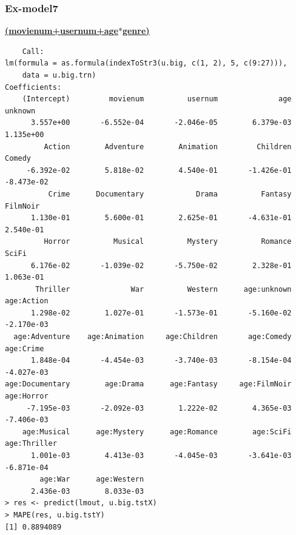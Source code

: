 \documentclass[11pt]{article}
\begin{document}
\subsubsection{Ex-model7}
\textbf{\underline{(movienum+usernum+age$*$genre)}}
\begin{verbatim}
    Call:
lm(formula = as.formula(indexToStr3(u.big, c(1, 2), 5, c(9:27))), 
    data = u.big.trn)
Coefficients:
    (Intercept)         movienum          usernum              age          unknown  
      3.557e+00       -6.552e-04       -2.046e-05        6.379e-03        1.135e+00  
         Action        Adventure        Animation         Children           Comedy  
     -6.392e-02        5.818e-02        4.540e-01       -1.426e-01       -8.473e-02  
          Crime      Documentary            Drama          Fantasy         FilmNoir  
      1.130e-01        5.600e-01        2.625e-01       -4.631e-01        2.540e-01  
         Horror          Musical          Mystery          Romance            SciFi  
      6.176e-02       -1.039e-02       -5.750e-02        2.328e-01        1.063e-01  
       Thriller              War          Western      age:unknown       age:Action  
      1.298e-02        1.027e-01       -1.573e-01       -5.160e-02       -2.170e-03  
  age:Adventure    age:Animation     age:Children       age:Comedy        age:Crime  
      1.848e-04       -4.454e-03       -3.740e-03       -8.154e-04       -4.027e-03  
age:Documentary        age:Drama      age:Fantasy     age:FilmNoir       age:Horror  
     -7.195e-03       -2.092e-03        1.222e-02        4.365e-03       -7.406e-03  
    age:Musical      age:Mystery      age:Romance        age:SciFi     age:Thriller  
      1.001e-03        4.413e-03       -4.045e-03       -3.641e-03       -6.871e-04  
        age:War      age:Western  
      2.436e-03        8.033e-03  
> res <- predict(lmout, u.big.tstX)
> MAPE(res, u.big.tstY)
[1] 0.8894089
\end{verbatim}
\end{document}
